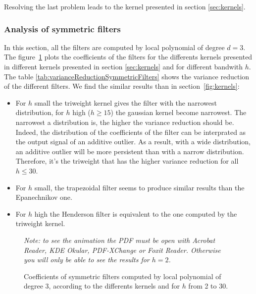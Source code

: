 \documentclass[
  12pt,
  ,
  a4paper]{article}
\newcommand\1{\mathds{1}}
\begin{document}
Resolving the last problem leads to the kernel presented in section \ref{sec:kernels}.

\hypertarget{analysis-of-symmetric-filters}{%
\subsubsection{Analysis of symmetric filters}\label{analysis-of-symmetric-filters}}

In this section, all the filters are computed by local polynomial of degree \(d=3\).
The figure~\ref{fig:filterscoefs} plots the coefficients of the filters for the differents kernels presented in different kernels presented in section \ref{sec:kernels} and for different bandwith \(h\).
The table \ref{tab:varianceReductionSymmetricFilters} shows the variance reduction of the different filters.
We find the similar results than in section~\ref{fig:kernels}:

\begin{itemize}
\item
  For \(h\) small the triweight kernel gives the filter with the narrowest distribution, for \(h\) high (\(h\geq15\)) the gaussian kernel become narrowest.
  The narrowest a distribution is, the higher the variance reduction should be.
  Indeed, the distribution of the coefficients of the filter can be interprated as the output signal of an additive outlier.
  As a result, with a wide distribution, an additive outlier will be more persistent than with a narrow distribution.
  Therefore, it's the triweight that has the higher variance reduction for all \(h\leq30\).
\item
  For \(h\) small, the trapezoidal filter seems to produce similar results than the Epanechnikov one.
\item
  For \(h\) high the Henderson filter is equivalent to the one computed by the triweight kernel.
\end{itemize}

\begin{figure}[H]
\caption{Coefficients of symmetric filters computed by local polynomial of degree $3$, according to the differents kernels and for $h$ from 2 to 30.}\label{fig:filterscoefs}\footnotesize
\emph{Note: to see the animation the PDF must be open with Acrobat Reader, KDE Okular, PDF-XChange or Foxit Reader.
Otherwise you will only be able to see the results for $h=2$.}
\end{figure}
\end{document}
